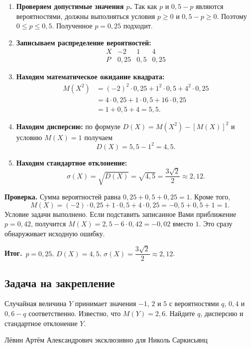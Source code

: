 \documentclass[a4paper,11pt]{article}
\newcommand{\outcome}{\textcolor{darkaccent}{\bfseries Итог.}}
\begin{document}
\begin{enumerate}
\item \textbf{Проверяем допустимые значения $p$.} Так как $p$ и $0{,}5-p$ являются вероятностями, должны выполняться условия $p\geqslant0$ и $0{,}5-p\geqslant0$. Поэтому $0\leqslant p\leqslant0{,}5$. Полученное $p=0{,}25$ подходит.
\item \textbf{Записываем распределение вероятностей:}
\[
\begin{array}{c|ccc}
X&-2&1&4\\\hline
P&0{,}25&0{,}5&0{,}25
\end{array}
\]
\item \textbf{Находим математическое ожидание квадрата:}
\begin{align*}
M(X^2)&=(-2)^2\cdot0{,}25+1^2\cdot0{,}5+4^2\cdot0{,}25\\
&=4\cdot0{,}25+1\cdot0{,}5+16\cdot0{,}25\\
&=1+0{,}5+4=5{,}5.
\end{align*}
\item \textbf{Находим дисперсию:} по формуле $D(X)=M(X^2)-[M(X)]^2$ и условию $M(X)=1$ получаем
\[
D(X)=5{,}5-1^2=\boxed{4{,}5}.
\]
\item \textbf{Находим стандартное отклонение:}
\[
\sigma(X)=\sqrt{D(X)}=\sqrt{4{,}5}=\frac{3\sqrt2}{2}\approx\boxed{2{,}12}.
\]
\end{enumerate}

\textbf{Проверка.} Сумма вероятностей равна $0{,}25+0{,}5+0{,}25=1$. Кроме того,
\[
M(X)=(-2)\cdot0{,}25+1\cdot0{,}5+4\cdot0{,}25=-0{,}5+0{,}5+1=1.
\]
Условие задачи выполнено. Если подставить записанное Вами приближение $p=0{,}42$, получится $M(X)=2{,}5-6\cdot0{,}42=-0{,}02$ вместо $1$. Это сразу обнаруживает исходную ошибку.

\outcome\ $p=0{,}25$, $D(X)=4{,}5$, $\sigma(X)=\dfrac{3\sqrt2}{2}\approx2{,}12$.

\subsection*{Задача на закрепление}
Случайная величина $Y$ принимает значения $-1$, $2$ и $5$ с вероятностями $q$, $0{,}4$ и $0{,}6-q$ соответственно. Известно, что $M(Y)=2{,}6$. Найдите $q$, дисперсию и стандартное отклонение $Y$.

\vfill
\begin{center}
{\footnotesize\color{textgray}Лёвин Артём Александрович эксклюзивно для Николь Саркисьянц}
\end{center}
\end{document}
